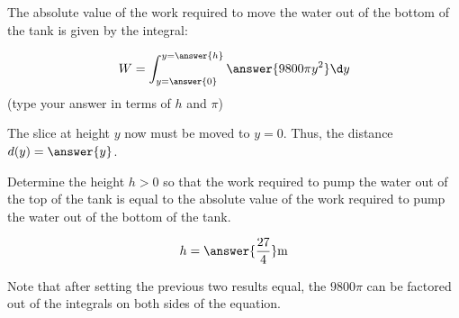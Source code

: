 \documentclass{ximera}
\begin{document}
\begin{exercise}
\begin{exercise}
The absolute value of the work required to move the water out of the bottom of the tank is given by the integral:

\[
W=\int_{y=\answer{0}}^{y=\answer{h}} \answer{9800\pi y^2} \d y  
\]
(type your answer in terms of $h$ and  $\pi$)

\begin{hint}
The slice at height $y$ now must be moved to $y=0$.  Thus, the distance $d(y) = \answer{y}$.
\end{hint}

\begin{exercise}

Determine the height $h>0$ so that the work required to pump the water out of the top of the tank is equal to the absolute value of the work required to pump the water out of the bottom of the tank.

\[
h=\answer{\frac{27}{4}} \text{m}
\]

\begin{hint}
Note that after setting the previous two results equal, the $9800 \pi$ can be factored out of the integrals on both sides of the equation.
\end{hint}

\end{exercise}
\end{exercise}
\end{exercise}
\end{document}
